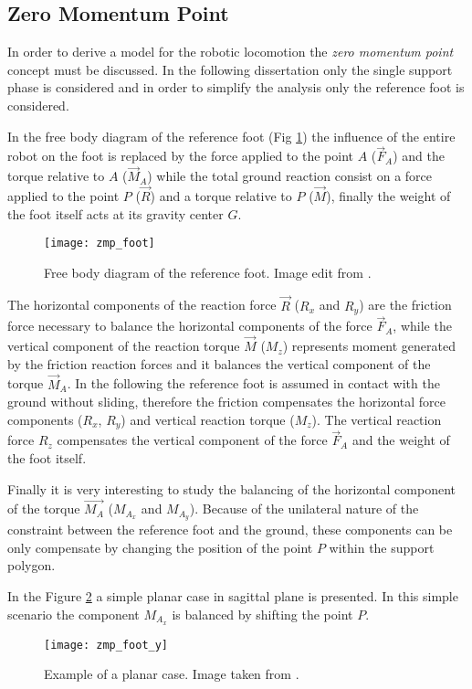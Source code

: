 \subsection{Zero Momentum Point}
In order to derive a model for the robotic locomotion the \emph{zero momentum point} concept
\cite{Vukobratovic1969} must be discussed.
In the following dissertation only the single support phase is considered and in order to simplify the analysis only the reference foot is considered.
\par
In the free body diagram of the reference foot (Fig \ref{fig:zmp_foot}) the influence of the
entire robot on the foot is replaced by the force applied to the point $A$
($\vec{F}_A$) and the torque relative to $A$ ($\vec{M}_A$) while the
total ground reaction consist on a force applied to the point $P$ ($\vec{R}$) and a torque
relative to $P$ ($\vec{M}$), finally the weight of the foot itself acts at its gravity center $G$.
\begin{figure}[!ht]
  \centering
  \texttt{[image: zmp\_foot]}
  \caption{Free body diagram of the reference foot. Image edit from \cite{Vukobratov2004}. \label{fig:zmp_foot}}
\end{figure}
\par
The horizontal components of the reaction force $\vec{R}$ ($R_x$ and $R_y$) are 
the friction force necessary to balance the horizontal components of the force $\vec{F}_A$, while
the vertical component of the reaction torque $\vec{M}$ ($M_z$) represents moment generated by the
friction reaction forces and it balances the vertical component of the torque $\vec{M}_A$.
In the following the reference foot is assumed in contact with the ground without sliding, therefore
the friction compensates the horizontal force components ($R_x$, $R_y$) and vertical reaction torque
($M_z$). The vertical reaction force $R_z$ compensates the vertical component of the force
$\vec{F}_A$ and the weight of the foot itself.  
\par
Finally it is very interesting to study the balancing of the horizontal component of the
torque $\vec{M_A}$ ($M_{A_x}$ and $M_{A_y}$). Because of the unilateral nature of the constraint between
the reference foot and the ground, these components can be only compensate by changing
the position of the point $P$ within the support polygon.
\par
In the Figure \ref{fig:zmp_foot_y} a simple planar case in sagittal plane is presented. In this
simple scenario the component $M_{A_x}$ is balanced by shifting the point $P$.
\begin{figure}[!ht]
  \centering
  \texttt{[image: zmp\_foot\_y]}
  \caption{Example of a planar case. Image taken from \cite{Vukobratov2004}. \label{fig:zmp_foot_y}}
\end{figure}

